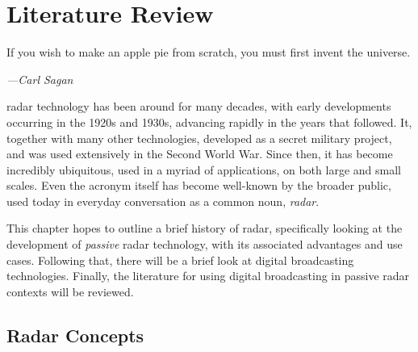 \documentclass[class=report,11pt,crop=false]{standalone}
\begin{document}
\ifstandalone
\tableofcontents
\fi
\chapter{Literature Review}
\epigraph{If you wish to make an apple pie from scratch, you must first invent the universe.}%
    {\emph{---Carl Sagan}}

\gls{radar} technology has been around for many decades, with early developments occurring in the 1920s and 1930s, advancing rapidly in the years that followed. It, together with many other technologies, developed as a secret military project, and was used extensively in the Second World War. Since then, it has become incredibly ubiquitous, used in a myriad of applications, on both large and small scales. Even the acronym itself has become well-known by the broader public, used today in everyday conversation as a common noun, \emph{radar}.

This chapter hopes to outline a brief history of radar, specifically looking at the development of \emph{passive} radar technology, with its associated advantages and use cases. Following that, there will be a brief look at digital broadcasting technologies. Finally, the literature for using digital broadcasting in passive radar contexts will be reviewed.

\section{Radar Concepts}
\end{document}
